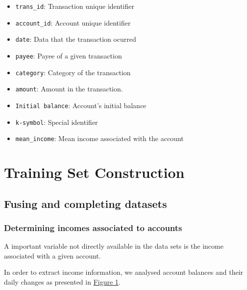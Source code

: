 \documentclass[]{article}
\begin{document}
\begin{itemize}
  \begin{itemize}
  \tightlist
  \item
    \texttt{trans\_id}: Transaction unique identifier
  \item
    \texttt{account\_id}: Account unique identifier
  \item
    \texttt{date}: Data that the transaction ocurred
  \item
    \texttt{payee}: Payee of a given transaction
  \item
    \texttt{category}: Category of the transaction
  \item
    \texttt{amount}: Amount in the transaction.
  \item
    \texttt{Initial\ balance}: Account's initial balance
  \item
    \texttt{k-symbol}: Special identifier
  \item
    \texttt{mean\_income}: Mean income associated with the account
  \end{itemize}
\end{itemize}

\section{Training Set Construction}\label{sec:training-set-construction}

\subsection{Fusing and completing
datasets}\label{fusing-and-completing-datasets}

\subsubsection{Determining incomes associated to
accounts}\label{determining-incomes-associated-to-accounts}

A important variable not directly available in the data sets is the
income associated with a given account.

In order to extract income information, we analysed account balances and
their daily changes as presented in
\protect\hyperlink{fig-balances-deltas}{Figure 1}.
\end{document}
